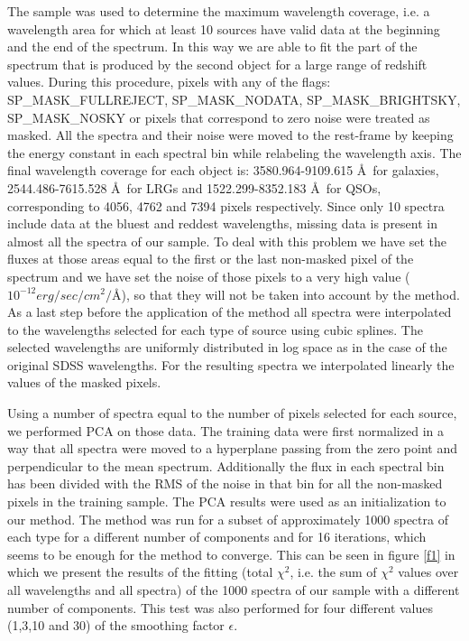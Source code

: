 \documentclass[apj]{emulateapj}
\begin{document}
The sample was used to determine the maximum wavelength coverage, i.e. a wavelength area for which at least 10 sources have valid data at the beginning and the end of the spectrum. In this way we are able to fit the part of the spectrum that is produced by the second object for a large range of redshift values. During this procedure, pixels with any of the flags: SP\_MASK\_FULLREJECT, SP\_MASK\_NODATA, SP\_MASK\_BRIGHTSKY, SP\_MASK\_NOSKY or pixels that correspond to zero noise were treated as masked. All the spectra and their noise were moved to the rest-frame by keeping the energy constant in each spectral bin while relabeling the wavelength axis.  The final wavelength coverage for each object is: 3580.964-9109.615 \AA\ for galaxies, 2544.486-7615.528 \AA\ for LRGs and 1522.299-8352.183 \AA\ for QSOs, corresponding to 4056, 4762 and 7394 pixels respectively. Since only 10 spectra include data at the bluest and reddest wavelengths, missing data is present in almost all the spectra of our sample. To deal with this problem we have set the fluxes at those areas equal to the first or the last non-masked pixel of the spectrum and we have set the noise of those pixels to a very high value ($10^{-12} erg/sec/cm^2/$\AA), so that they will not be taken into account by the method. As a last step before the application of the method all spectra were interpolated to the wavelengths selected for each type of source using cubic splines. The selected wavelengths are uniformly distributed in log space as in the case of the original SDSS wavelengths. For the resulting spectra we interpolated linearly the values of the masked pixels.

Using a number of spectra equal to the number of pixels selected for each source, we performed PCA on those data. The training data were first normalized in a way that all spectra were moved to a hyperplane passing from the zero point and perpendicular to the mean spectrum. Additionally the flux in each spectral bin has been divided with the RMS of the noise in that bin for all the non-masked pixels in the training sample. The PCA results were used as an initialization to our method. The method was run for a subset of approximately 1000 spectra of each type for a different number of components and for 16 iterations, which seems to be enough for the method to converge. This can be seen in figure \ref{f1} in which we present the results of the fitting (total $\chi^2$, i.e. the sum of $\chi^2$ values over all wavelengths and all spectra) of the 1000 spectra of our sample with a different number of components. This test was also performed for four different values (1,3,10 and 30) of the smoothing factor $\epsilon$.
\end{document}
